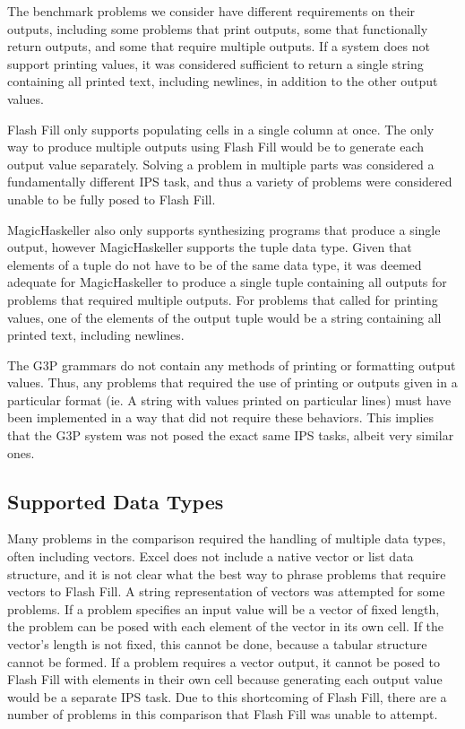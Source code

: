 The benchmark problems we consider have different requirements on their outputs, including some problems that print outputs, some that functionally return outputs, and some that require multiple outputs. If a system does not support printing values, it was considered sufficient to return a single string containing all printed text, including newlines, in addition to the other output values.

Flash Fill only supports populating cells in a single column at once. The only way to produce multiple outputs using Flash Fill would be to generate each output value separately. Solving a problem in multiple parts was considered a fundamentally different IPS task, and thus a variety of problems were considered unable to be fully posed to Flash Fill.

MagicHaskeller also only supports synthesizing programs that produce a single output, however MagicHaskeller supports the tuple data type. Given that elements of a tuple do not have to be of the same data type, it was deemed adequate for MagicHaskeller to produce a single tuple containing all outputs for problems that required multiple outputs. For problems that called for printing values, one of the elements of the output tuple would be a string containing all printed text, including newlines.

The G3P grammars do not contain any methods of printing or formatting output values. Thus, any problems that required the use of printing or outputs given in a particular format (ie. A string with values printed on particular lines) must have been implemented in a way that did not require these behaviors. This implies that the G3P system was not posed the exact same IPS tasks, albeit very similar ones.

\subsection{Supported Data Types}

Many problems in the comparison required the handling of multiple data types, often including vectors.  Excel does not include a native vector or list data structure, and it is not clear what the best way to phrase problems that require vectors to Flash Fill. A string representation of vectors was attempted for some problems. If a problem specifies an input value will be a vector of fixed length, the problem can be posed with each element of the vector in its own cell. If the vector's length is not fixed, this cannot be done, because a tabular structure cannot be formed. If a problem requires a vector output, it cannot be posed to Flash Fill with elements in their own cell because generating each output value would be a separate IPS task. Due to this shortcoming of Flash Fill, there are a number of problems in this comparison that Flash Fill was unable to attempt.


